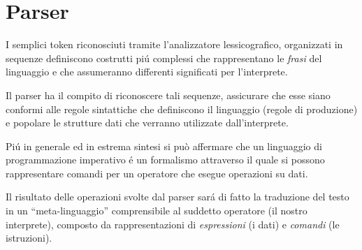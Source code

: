 \documentclass[a4paper,10pt]{article}
\begin{document}
\section{Parser}
I semplici token riconosciuti tramite l'analizzatore lessicografico,
organizzati in sequenze definiscono costrutti pi\'u complessi che rappresentano
le \textit{frasi} del linguaggio e che assumeranno differenti significati per
l'interprete.

Il parser ha il compito di riconoscere tali sequenze, assicurare che esse siano
conformi alle regole sintattiche che definiscono il linguaggio (regole di
produzione) e popolare le strutture dati che verranno utilizzate
dall'interprete.

Pi\'u in generale ed in estrema sintesi si può affermare che un linguaggio di
programmazione imperativo \'e un formalismo attraverso il quale si possono
rappresentare comandi per un operatore che esegue operazioni su dati.

Il risultato delle operazioni svolte dal parser sar\'a di fatto la traduzione
del testo in un ``meta-linguaggio'' comprensibile al suddetto operatore (il
nostro interprete), composto da rappresentazioni di \textit{espressioni} (i
dati) e \textit{comandi} (le istruzioni).
\end{document}
